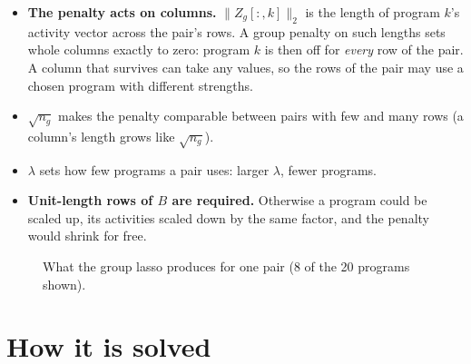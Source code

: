 \documentclass[11pt]{article}
\begin{document}
\begin{itemize}
  \item \textbf{The penalty acts on columns.} $\|Z_g[:,k]\|_2$ is the length of
  program $k$'s activity vector across the pair's rows. A group penalty on such
  lengths sets whole columns exactly to zero: program $k$ is then off for
  \emph{every} row of the pair. A column that survives can take any values, so
  the rows of the pair may use a chosen program with different strengths.
  \item \textbf{$\sqrt{n_g}$} makes the penalty comparable between pairs with
  few and many rows (a column's length grows like $\sqrt{n_g}$).
  \item \textbf{$\lambda$} sets how few programs a pair uses: larger $\lambda$,
  fewer programs.
  \item \textbf{Unit-length rows of $B$ are required.} Otherwise a program could
  be scaled up, its activities scaled down by the same factor, and the penalty
  would shrink for free.
\end{itemize}

\begin{figure}[h]
\centering
{}
\caption{What the group lasso produces for one pair (8 of the 20 programs shown).}
\end{figure}

\section{How it is solved}
\end{document}
